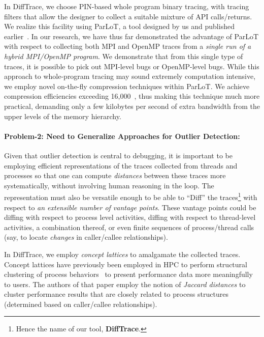 In DiffTrace, we choose PIN-based whole program binary tracing, with
tracing filters that allow the designer to collect a suitable mixture of API
calls/returns.
%
We realize this facility using
ParLoT, a tool designed by us and published earlier~\cite{parlot-paper}.
%
In our research, we have thus far demonstrated the advantage of
ParLoT with respect to collecting both MPI and OpenMP traces
from a {\em single run of a hybrid MPI/OpenMP program}.
%
We demonstrate that from this single type of traces, it is possible
to pick out MPI-level bugs or OpenMP-level bugs.
%
While this approach to whole-program tracing
may sound extremely computation intensive, we employ
novel on-the-fly compression techniques within ParLoT.
%
We achieve compression efficiencies exceeding 16,000~\cite{parlot-paper},
thus making this technique much more practical, demanding
only a few kilobytes per second of extra bandwidth from the upper levels of
the memory hierarchy.


\paragraph{Problem-2: Need to Generalize Approaches for Outlier Detection:\/}
Given that outlier detection is central to debugging,
it is important to be employing efficient representations of the traces
collected from threads and processes so that one can compute
{\em distances} between these traces more systematically, without
involving human reasoning in the loop.
%
The representation must also be versatile enough to
be able to ``Diff'' the traces\footnote{Hence the name of our tool, {\bf DiffTrace}.}
with respect to {\em an extensible number of vantage points}.
%
These vantage points could be diffing with respect to process level activities,
diffing with respect to thread-level activities, a combination thereof,
or even finite sequences of process/thread calls (say, to locate {\em changes}
in caller/callee relationships).


In DiffTrace, we employ {\em concept lattices} to amalgamate the collected traces.
%
Concept lattices have previously been employed in HPC to perform structural
clustering of process behaviors~\cite{weber-cl} to present performance data more
meaningfully to users.
%
The authors of that paper employ the notion of {\em Jaccard distances}
to cluster performance results that are closely related to process structures
(determined based on caller/callee relationships).


